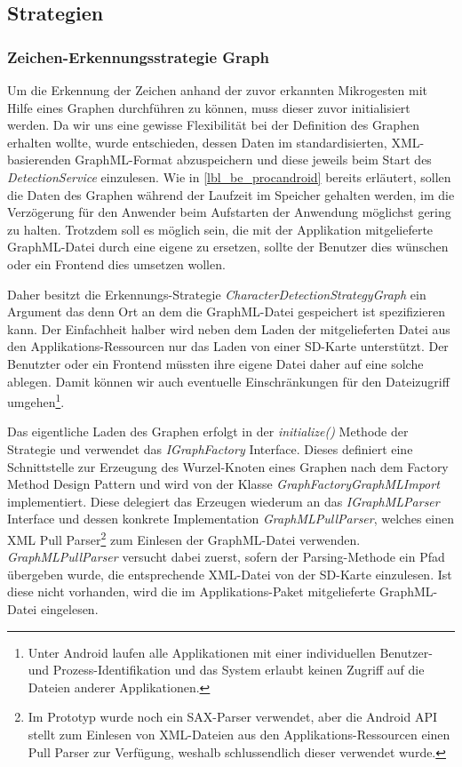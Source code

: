 \subsection{Strategien}

\subsubsection{Zeichen-Erkennungsstrategie Graph}

Um die Erkennung der Zeichen anhand der zuvor erkannten Mikrogesten mit Hilfe eines Graphen durchführen zu können, muss dieser zuvor initialisiert werden. Da wir uns eine gewisse Flexibilität bei der Definition des Graphen erhalten wollte, wurde entschieden, dessen Daten im standardisierten, XML-basierenden GraphML-Format\cite{graphml_primer} abzuspeichern und diese jeweils beim Start des \emph{DetectionService} einzulesen. Wie in \ref{lbl_be_procandroid} bereits erläutert, sollen die Daten des Graphen während der Laufzeit im Speicher gehalten werden, im die Verzögerung für den Anwender beim Aufstarten der Anwendung möglichst gering zu halten. Trotzdem soll es möglich sein, die mit der Applikation mitgelieferte GraphML-Datei durch eine eigene zu ersetzen, sollte der Benutzer dies wünschen oder ein Frontend dies umsetzen wollen.

Daher besitzt die Erkennungs-Strategie \emph{CharacterDetectionStrategyGraph} ein Argument das denn Ort an dem die GraphML-Datei gespeichert ist spezifizieren kann. Der Einfachheit halber wird neben dem Laden der mitgelieferten Datei aus den Applikations-Ressourcen nur das Laden von einer SD-Karte unterstützt. Der Benutzter oder ein Frontend müssten ihre eigene Datei daher auf eine solche ablegen. Damit können wir auch eventuelle Einschränkungen für den Dateizugriff umgehen\footnote{Unter Android laufen alle Applikationen mit einer individuellen Benutzer- und Prozess-Identifikation und das System erlaubt keinen Zugriff auf die Dateien anderer Applikationen.}.

Das eigentliche Laden des Graphen erfolgt in der \emph{initialize()} Methode der Strategie und verwendet das \emph{IGraphFactory} Interface. Dieses definiert eine Schnittstelle zur Erzeugung des Wurzel-Knoten eines Graphen nach dem Factory Method Design Pattern\cite[S.107-116]{designpatterns} und wird von der Klasse \emph{GraphFactoryGraphMLImport} implementiert. Diese delegiert das Erzeugen wiederum an das \emph{IGraphMLParser} Interface und dessen konkrete Implementation \emph{GraphMLPullParser}, welches einen XML Pull Parser\footnote{Im Prototyp wurde noch ein SAX-Parser verwendet, aber die Android API stellt zum Einlesen von XML-Dateien aus den Applikations-Ressourcen einen Pull Parser zur Verfügung, weshalb schlussendlich dieser verwendet wurde.} zum Einlesen der GraphML-Datei verwenden. \emph{GraphMLPullParser} versucht dabei zuerst, sofern der Parsing-Methode ein Pfad übergeben wurde, die entsprechende XML-Datei von der SD-Karte einzulesen. Ist diese nicht vorhanden, wird die im Applikations-Paket mitgelieferte GraphML-Datei eingelesen.

